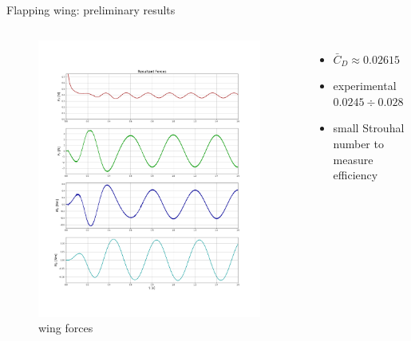 \documentclass[10pt,t]{beamer}
\begin{document}
\begin{frame}{Flapping wing: preliminary results}

    \begin{columns}

        \begin{figure}
        \vspace{-0.25cm}
	    \centering
	        \includegraphics[width=0.975\textwidth, trim=0 150 0 120, clip]{images/heathcote/forces_naca0012.png}
	        \caption{wing forces}
        \end{figure}

        \footnotesize
        \vspace{1.5cm}
        \begin{itemize}
            \item $\bar{C}_D\approx 0.02615$
            \item experimental $0.0245\div0.028$
            \item small Strouhal number to measure efficiency
        \end{itemize}
\end{columns}
    
\end{frame}
\end{document}
